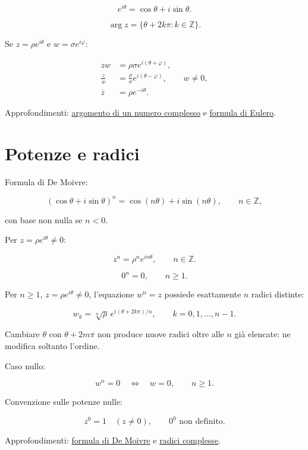 \[
\displaystyle
e^{i\theta}=\cos\theta+i\sin\theta.
\]

\[
\displaystyle
\arg z=\{\theta+2k\pi:k\in\mathbb Z\}.
\]

Se \(z=\rho e^{i\theta}\) e \(w=\sigma e^{i\varphi}\):

\[
\begin{aligned}
zw&=\rho\sigma e^{i(\theta+\varphi)},\\
\frac zw&=\frac\rho\sigma e^{i(\theta-\varphi)},\qquad w\ne0,\\
\overline z&=\rho e^{-i\theta}.
\end{aligned}
\]

Approfondimenti: \href{https://ingegnerismo.it/matematica/argomento-numero-complesso/}{argomento di un numero complesso} e \href{https://ingegnerismo.it/matematica/formula-di-eulero/}{formula di Eulero}.

\section{Potenze e radici}\label{potenze-e-radici}

Formula di De Moivre:

\[
\displaystyle
(\cos\theta+i\sin\theta)^n
=
\cos(n\theta)+i\sin(n\theta),
\qquad n\in\mathbb Z,
\]

con base non nulla se \(n<0\).

Per \(z=\rho e^{i\theta}\ne0\):

\[
\displaystyle
z^n=\rho^n e^{in\theta},
\qquad n\in\mathbb Z.
\]

\[
\displaystyle
0^n=0,
\qquad n\ge1.
\]

Per \(n\ge1\), \(z=\rho e^{i\theta}\ne0\), l'equazione \(w^n=z\) possiede esattamente \(n\) radici distinte:

\[
\displaystyle
w_k=\sqrt[n]{\rho}\,
e^{i(\theta+2k\pi)/n},
\qquad
k=0,1,\ldots,n-1.
\]

Cambiare \(\theta\) con \(\theta+2m\pi\) non produce nuove radici oltre alle \(n\) già elencate: ne modifica soltanto l'ordine.

Caso nullo:

\[
\displaystyle
w^n=0
\quad\Longleftrightarrow\quad
w=0,
\qquad n\ge1.
\]

Convenzione sulle potenze nulle:

\[
\displaystyle
z^0=1\quad(z\ne0),
\qquad
0^0\text{ non definito}.
\]

Approfondimenti: \href{https://ingegnerismo.it/matematica/formula-di-de-moivre/}{formula di De Moivre} e \href{https://ingegnerismo.it/matematica/radici-complesse/}{radici complesse}.

